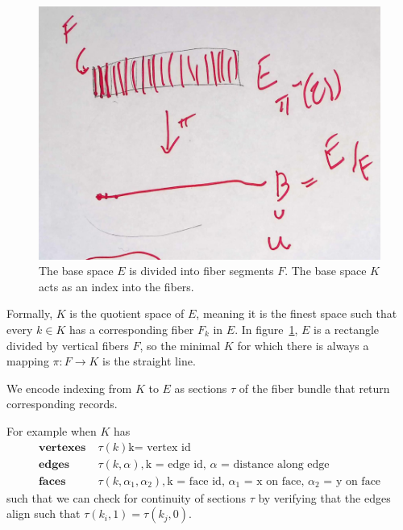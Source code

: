 \documentclass[../main.tex]{subfiles}
\begin{document}
\begin{figure}[ht!]
    \label{fig:base_space_div}
    \includegraphics[width=.5\linewidth]{figures/math/k_qspace.png}
    \caption{ The base space $E$ is divided into fiber segments $F$. The base space $K$ acts as an index into the fibers.}
\end{figure}

Formally, $K$ is the quotient space \cite{QuotientSpaceTopology2020} of $E$, meaning it is the finest space such that every $k \in K$ has a corresponding fiber $F_k$ in $E$. In figure~\ref{fig:base_space_div}, $E$ is a rectangle divided by vertical fibers $F$, so the minimal $K$ for which there is always a mapping $\pi: F\rightarrow K$ is the straight line. 

We encode indexing from $K$ to $E$ as sections $\tau$ of the fiber bundle that return corresponding records. 


For example when $K$ has
\begin{align*}
    \textbf{vertexes}\;& \tau(k) \text{k= vertex id}\\
    \textbf{edges}\;& \tau(k,\alpha), \text{k = edge id, $\alpha$ = distance along edge} \\
    \textbf{faces}\;& \tau(k,\alpha_1, \alpha_2), \text{k = face id, $\alpha_1$ = x on face, $\alpha_2$ = y on face}
\end{align*}
such that we can check for continuity of sections $\tau$ by verifying that the edges align such that $\tau(k_{i},1) = \tau(k_{j},0)$. 
\end{document}
